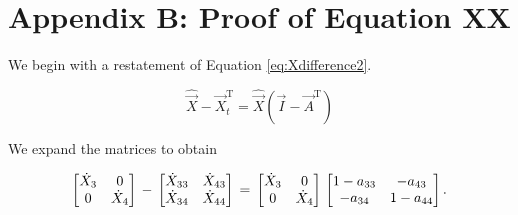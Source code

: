 %
%
%

\appendix
\chapter{Appendix B: Proof of Equation XX}
\label{app:B} %



We begin with a restatement of Equation \ref{eq:Xdifference2}.

\begin{equation} \label{eq:Xdifference2Proof-1}
	\hat{\vec{X}} - \vec{X}_t^\mathrm{T} = \hat{\vec{X}}(\vec{I} - \vec{A}^\mathrm{T})
\end{equation}

\noindent We expand the matrices to obtain

\begin{equation} \label{eq:Xdifference2Proof-2}
\begin{bmatrix} 	\dot{X}_{3} & 0	\\
				0 & \dot{X}_{4}	\\
\end{bmatrix} \\
 - \\
\begin{bmatrix} 	\dot{X}_{33} & \dot{X}_{43}	\\
				\dot{X}_{34} & \dot{X}_{44}	\\
\end{bmatrix} \\
= \\
\begin{bmatrix} 	\dot{X}_{3} & 0	\\
				0 & \dot{X}_{4}	\\
\end{bmatrix} \\
\begin{bmatrix} 	1 - a_{33} & -a_{43}	\\
				-a_{34} & 1 - a_{44}	\\
\end{bmatrix}.
\end{equation}

